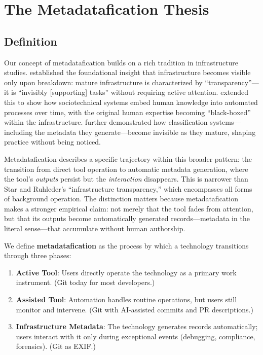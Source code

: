 \documentclass[12pt]{article}
\begin{document}
\section{The Metadatafication Thesis}

\subsection{Definition}

Our concept of metadatafication builds on a rich tradition in infrastructure studies. \citet{star1996steps} established the foundational insight that infrastructure becomes visible only upon breakdown: mature infrastructure is characterized by ``transparency''---it is ``invisibly [supporting] tasks'' without requiring active attention. \citet{edwards2003infrastructure} extended this to show how sociotechnical systems embed human knowledge into automated processes over time, with the original human expertise becoming ``black-boxed'' within the infrastructure. \citet{bowker1999sorting} further demonstrated how classification systems---including the metadata they generate---become invisible as they mature, shaping practice without being noticed.

Metadatafication describes a specific trajectory within this broader pattern: the transition from direct tool operation to automatic metadata generation, where the tool's \textit{outputs} persist but the \textit{interaction} disappears. This is narrower than Star and Ruhleder's ``infrastructure transparency,'' which encompasses all forms of background operation. The distinction matters because metadatafication makes a stronger empirical claim: not merely that the tool fades from attention, but that its outputs become automatically generated records---metadata in the literal sense---that accumulate without human authorship.

We define \textbf{metadatafication} as the process by which a technology transitions through three phases:

\begin{enumerate}
  \item \textbf{Active Tool}: Users directly operate the technology as a primary work instrument. (Git today for most developers.)
  \item \textbf{Assisted Tool}: Automation handles routine operations, but users still monitor and intervene. (Git with AI-assisted commits and PR descriptions.)
  \item \textbf{Infrastructure Metadata}: The technology generates records automatically; users interact with it only during exceptional events (debugging, compliance, forensics). (Git as EXIF.)
\end{enumerate}
\end{document}
